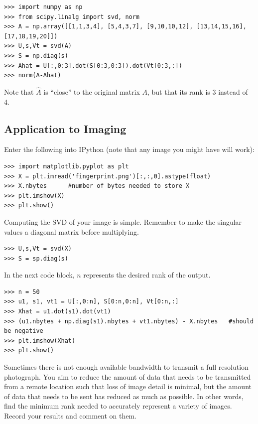 \begin{lstlisting}
>>> import numpy as np
>>> from scipy.linalg import svd, norm
>>> A = np.array([[1,1,3,4], [5,4,3,7], [9,10,10,12], [13,14,15,16], [17,18,19,20]])
>>> U,s,Vt = svd(A)
>>> S = np.diag(s)
>>> Ahat = U[:,0:3].dot(S[0:3,0:3]).dot(Vt[0:3,:])
>>> norm(A-Ahat)
\end{lstlisting}
Note that $\widehat A$ is ``close'' to the original matrix $A$, but that its rank is 3 instead of 4.

\subsection*{Application to Imaging}
Enter the following into IPython (note that any image you might have will work):
\begin{lstlisting}
>>> import matplotlib.pyplot as plt
>>> X = plt.imread('fingerprint.png')[:,:,0].astype(float)
>>> X.nbytes      #number of bytes needed to store X
>>> plt.imshow(X)
>>> plt.show()
\end{lstlisting}
Computing the SVD of your image is simple.
Remember to make the singular values a diagonal matrix before multiplying.
\begin{lstlisting}
>>> U,s,Vt = svd(X)
>>> S = sp.diag(s)
\end{lstlisting}
In the next code block, $n$ represents the desired rank of the output.
\begin{lstlisting}
>>> n = 50
>>> u1, s1, vt1 = U[:,0:n], S[0:n,0:n], Vt[0:n,:]
>>> Xhat = u1.dot(s1).dot(vt1)
>>> (u1.nbytes + np.diag(s1).nbytes + vt1.nbytes) - X.nbytes   #should be negative
>>> plt.imshow(Xhat)
>>> plt.show()
\end{lstlisting}


\begin{problem}
Sometimes there is not enough available bandwidth to transmit a full resolution photograph.
You aim to reduce the amount of data that needs to be transmitted from a remote location such that loss of image detail is minimal, but the amount of data that needs to be sent has reduced as much as possible.
In other words, find the minimum rank needed to accurately represent a variety of images.
Record your results and comment on them.
\end{problem}
